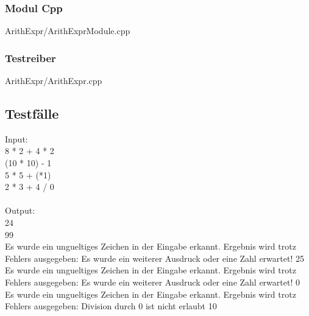 \documentclass[10pt,a4paper]{scrartcl}
\begin{document}
\subsubsection{Modul Cpp}


{ArithExpr/ArithExprModule.cpp}

\newpage
\subsubsection{Testreiber}


{ArithExpr/ArithExpr.cpp}

\newpage
\subsection{Testf\"{a}lle}

Input:
\\
8 * 2 + 4 * 2\\
(10 * 10) - 1\\
5 * 5 + (*1)\\
2 * 3 + 4 / 0
\\\\
Output:
\\
24\\
99\\
Es wurde ein ungueltiges Zeichen in der Eingabe erkannt. Ergebnis wird trotz Fehlers ausgegeben: Es wurde ein weiterer Ausdruck oder eine Zahl erwartet! 25\\
Es wurde ein ungueltiges Zeichen in der Eingabe erkannt. Ergebnis wird trotz Fehlers ausgegeben: Es wurde ein weiterer Ausdruck oder eine Zahl erwartet! 0\\
Es wurde ein ungueltiges Zeichen in der Eingabe erkannt. Ergebnis wird trotz Fehlers ausgegeben: Division durch 0 ist nicht erlaubt 10
\end{document}

